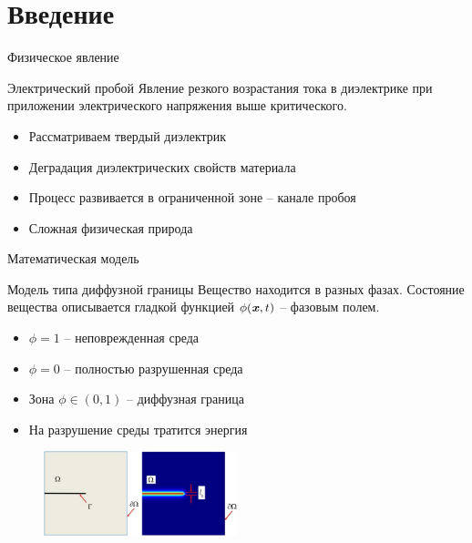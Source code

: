 
\section{Введение}

\begin{frame}{Физическое явление}
\begin{block}{Электрический пробой}
	Явление резкого возрастания тока в диэлектрике при приложении электрического напряжения
	выше критического.
\end{block}
\begin{itemize}
	\item Рассматриваем твердый диэлектрик
	\item Деградация диэлектрических свойств материала
	\item Процесс развивается в ограниченной зоне -- канале пробоя
	\item Сложная физическая природа
\end{itemize}
\end{frame}


\begin{frame}{Математическая модель}
\begin{block}{Модель типа диффузной границы}
	Вещество находится в разных фазах. Состояние вещества описывается гладкой функцией
	$\phi({\textbf{\textit{x}}}, t)$ -- фазовым полем.
\end{block}
\begin{itemize}
	\item $\phi = 1$ -- неповрежденная среда
	\item $\phi = 0$ -- полностью разрушенная среда
	\item Зона $\phi \in (0, 1)$ -- диффузная граница
	\item На разрушение среды тратится энергия
\end{itemize}
\begin{figure}
	\includegraphics[width=0.5\textwidth]{figures/diffuse_edge.jpg}
\end{figure}
\end{frame}


